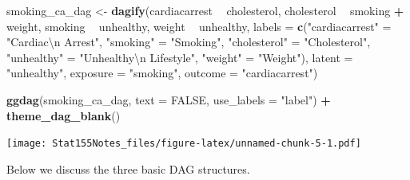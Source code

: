 \documentclass[]{book}
\newenvironment{Shaded}{\begin{snugshade}}{\end{snugshade}}
\newcommand{\CharTok}[1]{\textcolor[rgb]{0.31,0.60,0.02}{#1}}
\newcommand{\DataTypeTok}[1]{\textcolor[rgb]{0.13,0.29,0.53}{#1}}
\newcommand{\KeywordTok}[1]{\textcolor[rgb]{0.13,0.29,0.53}{\textbf{#1}}}
\newcommand{\NormalTok}[1]{#1}
\newcommand{\OperatorTok}[1]{\textcolor[rgb]{0.81,0.36,0.00}{\textbf{#1}}}
\newcommand{\OtherTok}[1]{\textcolor[rgb]{0.56,0.35,0.01}{#1}}
\newcommand{\StringTok}[1]{\textcolor[rgb]{0.31,0.60,0.02}{#1}}
\begin{document}
\begin{Shaded}
\begin{Highlighting}[]
\NormalTok{smoking_ca_dag <-}\StringTok{ }\KeywordTok{dagify}\NormalTok{(cardiacarrest }\OperatorTok{~}\StringTok{ }\NormalTok{cholesterol,}
\NormalTok{       cholesterol }\OperatorTok{~}\StringTok{ }\NormalTok{smoking }\OperatorTok{+}\StringTok{ }\NormalTok{weight,}
\NormalTok{       smoking }\OperatorTok{~}\StringTok{ }\NormalTok{unhealthy,}
\NormalTok{       weight }\OperatorTok{~}\StringTok{ }\NormalTok{unhealthy,}
       \DataTypeTok{labels =} \KeywordTok{c}\NormalTok{(}\StringTok{"cardiacarrest"}\NormalTok{ =}\StringTok{ "Cardiac}\CharTok{\textbackslash{}n}\StringTok{ Arrest"}\NormalTok{, }
                  \StringTok{"smoking"}\NormalTok{ =}\StringTok{ "Smoking"}\NormalTok{,}
                  \StringTok{"cholesterol"}\NormalTok{ =}\StringTok{ "Cholesterol"}\NormalTok{,}
                  \StringTok{"unhealthy"}\NormalTok{ =}\StringTok{ "Unhealthy}\CharTok{\textbackslash{}n}\StringTok{ Lifestyle"}\NormalTok{,}
                  \StringTok{"weight"}\NormalTok{ =}\StringTok{ "Weight"}\NormalTok{),}
       \DataTypeTok{latent =} \StringTok{"unhealthy"}\NormalTok{,}
       \DataTypeTok{exposure =} \StringTok{"smoking"}\NormalTok{,}
       \DataTypeTok{outcome =} \StringTok{"cardiacarrest"}\NormalTok{)}

\KeywordTok{ggdag}\NormalTok{(smoking_ca_dag, }\DataTypeTok{text =} \OtherTok{FALSE}\NormalTok{, }\DataTypeTok{use_labels =} \StringTok{"label"}\NormalTok{) }\OperatorTok{+}
\StringTok{  }\KeywordTok{theme_dag_blank}\NormalTok{()}
\end{Highlighting}
\end{Shaded}

\texttt{[image: Stat155Notes\_files/figure-latex/unnamed-chunk-5-1.pdf]}

Below we discuss the three basic DAG structures.
\end{document}
